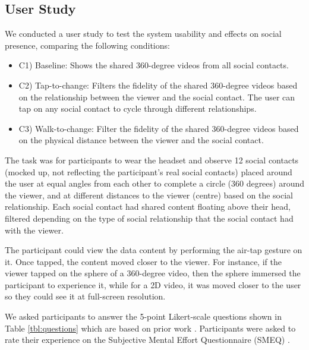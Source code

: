 \subsection{User Study}

We conducted a user study to test the system usability and effects on social presence, comparing the following conditions: 

\begin{itemize}
    \item C1) Baseline: Shows the shared 360-degree videos from all social contacts.
    \item C2) Tap-to-change: Filters the fidelity of the shared 360-degree videos based on the relationship between the viewer and the social contact. The user can tap on any social contact to cycle through different relationships.
    \item C3) Walk-to-change: Filter the fidelity of the shared 360-degree videos based on the physical distance between the viewer and the social contact.
\end{itemize}

The task was for participants to wear the headset and observe 12 social contacts (mocked up, not reflecting the participant's real social contacts) placed around the user at equal angles from each other to complete a circle (360 degrees) around the viewer, and at different distances to the viewer (centre) based on the social relationship. Each social contact had shared content floating above their head, filtered depending on the type of social relationship that the social contact had with the viewer. 

The participant could view the data content by performing the air-tap gesture on it. Once tapped, the content moved closer to the viewer. For instance, if the viewer tapped on the sphere of a 360-degree video, then the sphere immersed the participant to experience it, while for a 2D video, it was moved closer to the user so they could see it at full-screen resolution.

We asked participants to answer the 5-point Likert-scale questions shown in Table \ref{tbl:questions} which are based on prior work \cite{Biocca2003}. Participants were asked to rate their experience on the Subjective Mental Effort Questionnaire (SMEQ) \cite{Sauro2009}. 

